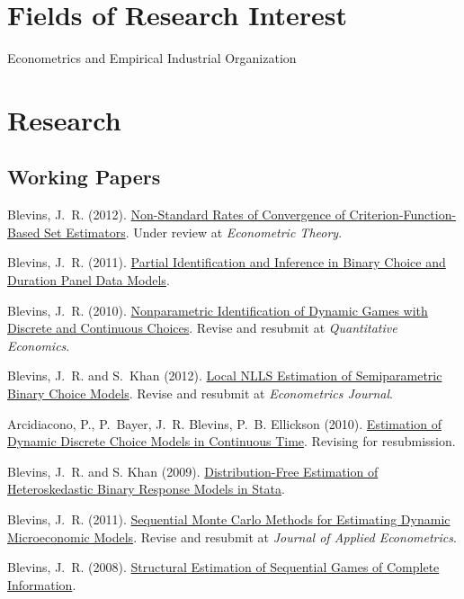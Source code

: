 \documentclass[10pt,letterpaper]{article}
\renewenvironment{itemize}{
  \begin{list}{}{
    \setlength{\leftmargin}{1.5em}
    \setlength{\itemsep}{0.25em}
    \setlength{\parskip}{0pt}
    \setlength{\parsep}{0.25em}
  }
}{
  \end{list}
}
\begin{document}
\section*{Fields of Research Interest}

Econometrics and Empirical Industrial Organization

\section*{Research}

\subsection*{Working Papers}

\begin{itemize}
\item Blevins, J.~R. (2012).
  \href{http://jblevins.org/research/cuberoot}{Non-Standard Rates of Convergence of Criterion-Function-Based Set Estimators}.
  Under review at \textit{Econometric Theory}.
\item Blevins, J.~R. (2011).
  \href{http://jblevins.org/research/panel}{Partial Identification and Inference in Binary Choice and Duration Panel Data Models}.
\item Blevins, J.~R. (2010).
  \href{http://jblevins.org/research/dcident}{Nonparametric Identification of Dynamic Games with Discrete and Continuous Choices}.
  Revise and resubmit at \textit{Quantitative Economics}.
\item Blevins, J.~R. and S.~Khan (2012).
  \href{http://jblevins.org/research/lnlls}{Local NLLS Estimation of Semiparametric Binary Choice Models}.
  Revise and resubmit at \textit{Econometrics Journal}.
\item Arcidiacono, P., P.~Bayer, J.~R. Blevins, P.~B. Ellickson (2010).
  \href{http://jblevins.org/research/abbe}{Estimation of Dynamic Discrete Choice Models in Continuous Time}.
  Revising for resubmission.
\item Blevins, J.~R. and S. Khan (2009).
  \href{http://jblevins.org/research/dfbr}{Distribution-Free Estimation of Heteroskedastic Binary Response Models in Stata}.
\item Blevins, J.~R. (2011).
  \href{http://jblevins.org/research/smcdmm}{Sequential Monte Carlo Methods for Estimating Dynamic Microeconomic Models}.
  Revise and resubmit at \textit{Journal of Applied Econometrics}.
\item Blevins, J.~R. (2008).
  \href{http://jblevins.org/research/seqgame}{Structural Estimation of Sequential Games of Complete Information}.
\end{itemize}
\end{document}
